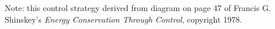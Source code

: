 





Note: this control strategy derived from diagram on page 47 of Francis G. Shinskey's {\it Energy Conservation Through Control}, copyright 1978.





